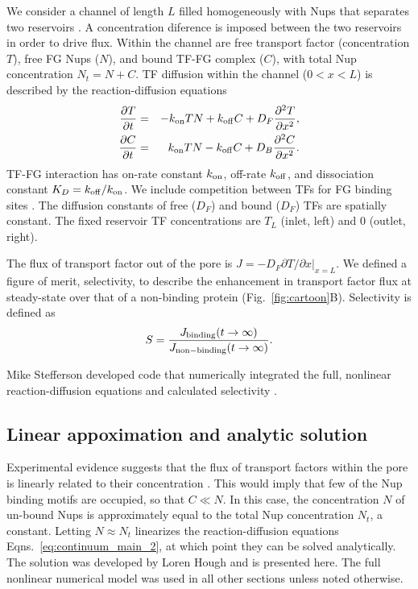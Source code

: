 We consider a channel of length $L$ filled homogeneously with Nups
that separates two reservoirs .  A concentration diference is imposed between the two reservoirs in order to drive flux.  Within the
channel are free transport factor (concentration $T$), free FG Nups
($N$), and bound TF-FG complex ($C$), with total Nup concentration
$N_t= N+C$.  TF diffusion within the channel ($0<x<L$) is described by
the reaction-diffusion equations
\begin{eqnarray}
  \frac{\partial T}{\partial t} &=& -k_{\rm on} T N+k_{\rm off} C +D_F
       \frac{\partial^2 T}{\partial x^2},\label{eq:continuum_main} 
   \\ 
  \frac{\partial C}{\partial t} &=& k_{\rm on} T N -k_{\rm off} C + 
        D_B \frac{\partial^2 C}{\partial x^2} .
\label{eq:continuum_main_2} 
\end{eqnarray}
TF-FG interaction has on-rate constant $k_{\rm on}$, off-rate $k_{\rm off}$, and
dissociation constant $K_D =k_{\rm off}/k_{\rm on}$.  We include competition
between TFs for FG binding sites \cite{timney16}.  The
diffusion constants of free ($D_F$) and bound ($D_F$) TFs are
spatially constant. The fixed reservoir TF concentrations are $T_L$
(inlet, left) and 0 (outlet, right).

The flux of transport factor out of the pore is
$J = - D_F \left. \partial T/\partial x \right|_{x=L}$.
We defined a figure of merit, selectivity, to describe the enhancement in transport factor flux at steady-state over that of a non-binding protein (Fig.~\ref{fig:cartoon}B).  Selectivity is defined as
\begin{equation}
  S =  \frac{J_{\rm binding}(t \to \infty)}{J_{\rm non-binding}(t \to \infty)} .
\end{equation}

Mike Stefferson developed code that numerically integrated the full, nonlinear reaction-diffusion equations and calculated selectivity \cite{stefferson18}.

\subsection{Linear appoximation and analytic solution}
\label{sec:linear}
Experimental evidence suggests that the flux of transport factors within the pore is linearly related to their concentration \cite{timney06, schmidt15}.  This would imply that few of the Nup binding motifs are occupied, so that $C \ll N$.  In this case, the concentration $N$ of un-bound Nups is approximately equal to the total Nup concentration $N_t$, a constant.  Letting $N \approx N_t$ linearizes the reaction-diffusion equations Eqns.~\ref{eq:continuum_main_2}, at which point they can be solved analytically.  The solution was developed by Loren Hough and is presented here.  The full nonlinear numerical model was used in all other sections unless noted otherwise.

